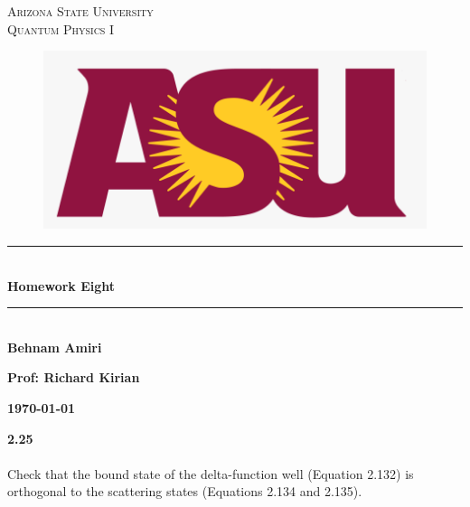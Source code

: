 \documentclass[fleqn]{article}
\begin{document}
  \begin{titlepage}

    \newcommand{\HRule}{\rule{\linewidth}{0.5mm}}

    \center


    \textsc{\LARGE Arizona State University}\\[1.5cm]

    \textsc{\LARGE Quantum Physics I }\\[1.5cm]


    \begin{figure}
      \includegraphics[width=\linewidth]{asu.png}
    \end{figure}


    \HRule \\[0.4cm]
    { \huge \bfseries Homework Eight}\\[0.4cm] 
    \HRule \\[1.5cm]

    \textbf{Behnam Amiri}

    \bigbreak

    \textbf{Prof: Richard Kirian}

    \bigbreak


    \textbf{{\large \today}\\[2cm]}

    \vfill 

  \end{titlepage}

  \textbf{2.25} \\ \\
  Check that the bound state of the delta-function well (Equation 2.132) is orthogonal to the 
  scattering states (Equations 2.134 and 2.135).
\end{document}
